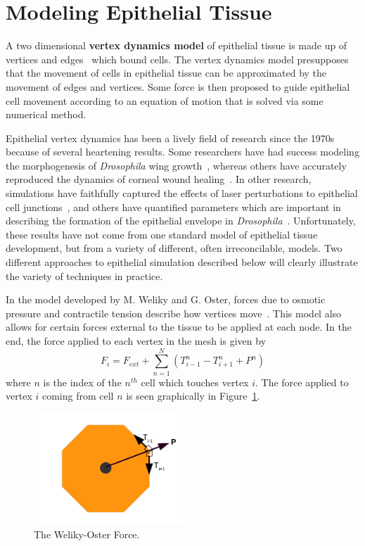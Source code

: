 \section{Modeling Epithelial Tissue} 
\label{sec:modeling}

A two dimensional \textbf{vertex dynamics model} of epithelial tissue is made up of vertices and edges~\cite{DirichletDomains} which bound cells. The vertex dynamics model presupposes that the movement of cells in epithelial tissue can be approximated by the movement of edges and vertices. Some force is then proposed to guide epithelial cell movement according to an equation of motion that is solved via some numerical method.

Epithelial vertex dynamics has been a lively field of research since the 1970s because of several heartening results. Some researchers have had success modeling the morphogenesis of \emph{Drosophila} wing growth~\cite{Farhadifar}, whereas others have accurately reproduced the dynamics of corneal wound healing~\cite{WoundHealing}. In other research, simulations have faithfully captured the effects of laser perturbations to epithelial cell junctions~\cite{Yoshi}, and others have quantified parameters which are important in describing the formation of the epithelial envelope in \emph{Drosophila}~\cite{Sokolow}. Unfortunately, these results have not come from one standard model of epithelial tissue development, but from a variety of different, often irreconcilable, models. Two different approaches to epithelial simulation described below will clearly illustrate the variety of techniques in practice.

In the model developed by M. Weliky and G. Oster, forces due to osmotic pressure and contractile tension describe how vertices move~\cite{WO}. This model also allows for certain forces external to the tissue to be applied at each node. In the end, the force applied to each vertex in the mesh is given by
\begin{equation*}
F_i = F_{ext}+\sum\limits_{n=1}^N(T_{i-1}^n - T_{i+1}^n + P^n)
\end{equation*}
where $n$ is the index of the $n^{th}$ cell which touches vertex $i$. The force applied to vertex $i$ coming from cell $n$  is seen graphically in Figure~\ref{fig:WO}.
\begin{figure}[h]
\centering
\includegraphics[width=0.5\textwidth]{../diagrams/welikyoster.png}
\caption{The Weliky-Oster Force.}
\label{fig:WO}
\end{figure}

